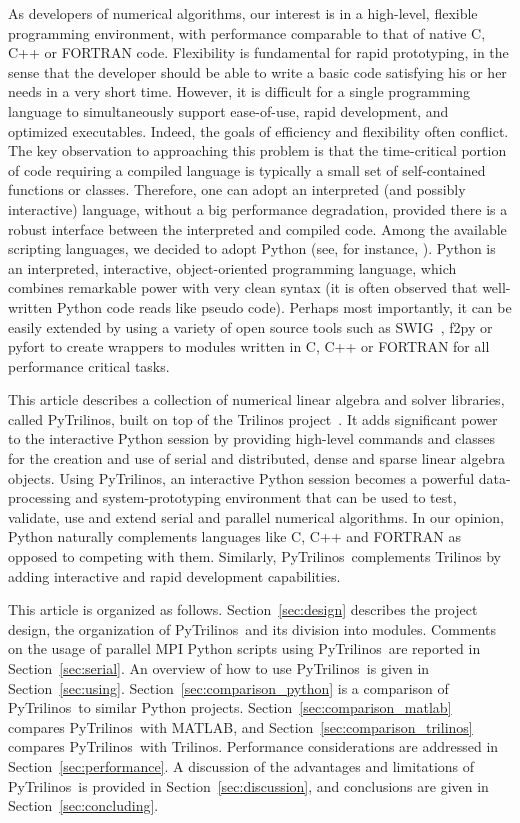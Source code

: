 \documentclass[acmtocl]{acmtrans2m}
\newcommand{\PyTrilinos}{{PyTrilinos}}
\begin{document}
As developers of numerical algorithms, our interest is in a
high-level, flexible programming environment, with performance
comparable to that of native C, C++ or FORTRAN code.  Flexibility is
fundamental for rapid prototyping, in the sense that the developer
should be able to write a basic code satisfying his or her needs in a
very short time.  However, it is difficult for a single programming
language to simultaneously support ease-of-use, rapid development, and
optimized executables.  Indeed, the goals of efficiency and
flexibility often conflict.  The key observation to approaching this
problem is that the time-critical portion of code requiring a compiled
language is typically a small set of self-contained functions or
classes.  Therefore, one can adopt an interpreted (and possibly
interactive) language, without a big performance degradation, provided
there is a robust interface between the interpreted and compiled code.
Among the available scripting languages, we decided to adopt Python
(see, for instance, \cite{python-book}).  Python is an interpreted,
interactive, object-oriented programming language, which combines
remarkable power with very clean syntax (it is often observed that
well-written Python code reads like pseudo code).  Perhaps most
importantly, it can be easily extended by using a variety of open
source tools such as SWIG~\cite{swig}, f2py or pyfort to create
wrappers to modules written in C, C++ or FORTRAN for all performance
critical tasks.

This article describes a collection of numerical linear algebra and
solver libraries, called \PyTrilinos, built on top of the Trilinos
project~\cite{Trilinos-home-page,Heroux:2005:OTP}.  It adds
significant power to the interactive Python session by providing
high-level commands and classes for the creation and use of serial and
distributed, dense and sparse linear algebra objects.  Using
\PyTrilinos, an interactive Python session becomes a powerful
data-processing and system-prototyping environment that can be used to
test, validate, use and extend serial and parallel numerical
algorithms.  In our opinion, Python naturally complements languages
like C, C++ and FORTRAN as opposed to competing with them.  Similarly,
\PyTrilinos\ complements Trilinos by adding interactive and rapid
development capabilities.

\smallskip

This article is organized as follows.  Section~\ref{sec:design}
describes the project design, the organization of \PyTrilinos\ and
its division into modules.  Comments on the usage of parallel MPI
Python scripts using \PyTrilinos\ are reported in
Section~\ref{sec:serial}. An overview of how to use \PyTrilinos\ is
given in Section~\ref{sec:using}.
Section~\ref{sec:comparison_python} is a comparison of \PyTrilinos\
to similar Python projects. Section~\ref{sec:comparison_matlab}
compares \PyTrilinos\ with MATLAB, and
Section~\ref{sec:comparison_trilinos} compares \PyTrilinos\ with
Trilinos.  Performance considerations are addressed in
Section~\ref{sec:performance}.  A discussion of the advantages and
limitations of \PyTrilinos\ is provided in
Section~\ref{sec:discussion}, and conclusions are given in
Section~\ref{sec:concluding}.
\end{document}
